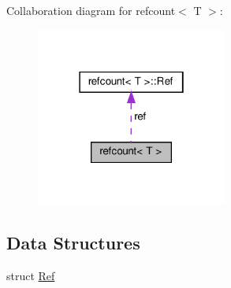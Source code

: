 Collaboration diagram for refcount$<$ T $>$\+:
\nopagebreak
\begin{figure}[H]
\begin{center}
\leavevmode
\includegraphics[width=178pt]{de/d04/structrefcount__coll__graph}
\end{center}
\end{figure}
\subsection*{Data Structures}
\begin{DoxyCompactItemize}
\item 
struct \hyperlink{structrefcount_1_1Ref}{Ref}
\end{DoxyCompactItemize}
